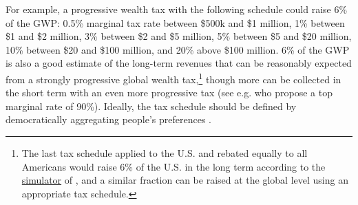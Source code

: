\documentclass[12pt,english]{article}
\begin{document}
For example, a progressive wealth tax with the following schedule could raise 6\% of the GWP: 0.5\% marginal tax rate between \$500k and \$1 million, 1\% between \$1 and \$2 million, 3\% between \$2 and \$5 million, 5\% between \$5 and \$20 million, 10\% between \$20 and \$100 million, and 20\% above \$100 million. %
6\% of the GWP is also a good estimate of the long-term revenues that can be reasonably expected from a strongly progressive global wealth tax,\footnote{The last tax schedule applied to the U.S. and rebated equally to all Americans would raise 6\% of the U.S. in the long term according to the \href{https://thomasblanchet.github.io/wealth-tax/}{simulator} of \citet{blanchet_uncovering_2022}, and a similar fraction can be raised at the global level using an appropriate tax schedule.} though more can be collected in the short term with an even more progressive tax (see e.g. \citealp{chancel_world_2022} who propose a top marginal rate of 90\%). 
Ideally, the tax schedule should be defined by democratically aggregating people's preferences \citep{fabre_french_2022}. 
\end{document}
